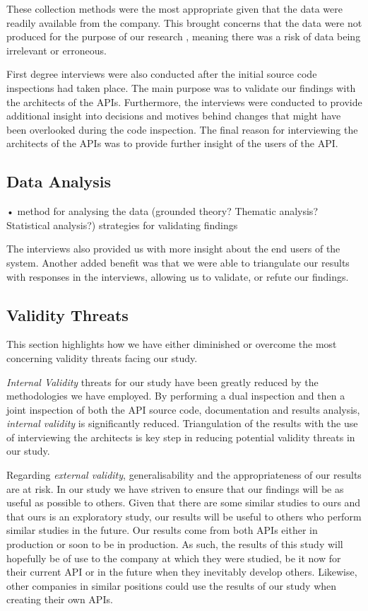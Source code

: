 \documentclass[10pt,twocolumn]{article}
\begin{document}
These collection methods were the most appropriate given that the data were readily available from the company. This brought concerns that the data were not produced for the purpose of our research \cite{runeson2009guidelines}, meaning there was a risk of data being irrelevant or erroneous. 

First degree interviews were also conducted after the initial source code inspections had taken place. The main purpose was to validate our findings with the architects of the APIs. Furthermore, the interviews were conducted to provide additional insight into decisions and motives behind changes that might have been overlooked during the code inspection. The final reason for interviewing the architects of the APIs was to provide further insight of the users of the API. 



\subsection{Data Analysis}
• method for analysing the data (grounded theory? Thematic analysis? Statistical analysis?) strategies for validating findings



The interviews also provided us with more insight about the end users of the system. Another added benefit was that we were able to triangulate our results with responses in the interviews, allowing us to validate, or refute our findings.

\subsection{Validity Threats}
This section highlights how we have either diminished or overcome the most concerning validity threats facing our study.

\textit{Internal Validity} threats for our study have been greatly reduced by the methodologies we have employed. By performing a dual inspection and then a joint inspection of both the API source code, documentation and results analysis, \textit{internal validity} is significantly reduced. Triangulation of the results with the use of interviewing the architects is key step in reducing potential validity threats in our study.

Regarding \textit{external validity}, generalisability and the appropriateness of our results are at risk. In our study we have striven to ensure that our findings will be as useful as possible to others. Given that there are some similar studies to ours and that ours is an exploratory study, our results will be useful to others who perform similar studies in the future. Our results come from both APIs either in production or soon to be in production. As such, the results of this study will hopefully be of use to the company at which they were studied, be it now for their current API or in the future when they inevitably develop others. Likewise, other companies in similar positions could use the results of our study when creating their own APIs.
\end{document}
